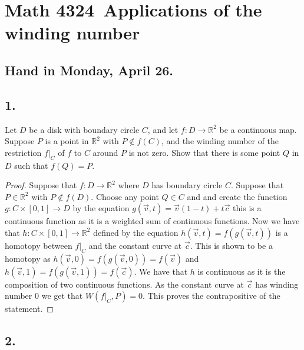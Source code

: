 \documentclass{amsart}
\theoremstyle{plain}
\theoremstyle{definition}
\theoremstyle{remark}
\begin{document}
\section*{Math 4324\  Applications of the winding number} 

\subsection*{Hand in Monday, April 26.} 

\vspace{.25in}

\vspace{.25in}
\noindent
\subsection*{1.} Let $D$ be  a disk with boundary circle $C$, and let $f: D\to \mathbb{R}^2$ be a continuous map. Suppose $P$ is a point in $\mathbb{R}^2$ with $P\not \in f(C)$, and the winding number of the restriction $f|_C$ of $f$ to $C$ around $P$ is not zero. Show that there is some point $Q$ in $D$ such that $f(Q) = P$.

\begin{proof}

    Suppose that $f:D\to \mathbb{R}^2$ where $D$ has boundary circle $C$. Suppose that $P\in \mathbb{R}^2$ with $P\not \in f(D)$. Choose any point $Q\in C$ and and create the function $g:C\times [0,1]\to D$ by the equation $g(\vec v, t)=\vec v(1-t)+t \vec c$ this is a continuous function as it is a weighted sum of continuous functions. Now we have that $h:C\times [0,1]\to \mathbb{R}^2$ defined by the equation $h(\vec v,t)=f(g(\vec v,t))$ is a homotopy between $f|_C$ and the constant curve at $\vec c$. This is shown to be a homotopy as $h(\vec v,0)=f(g(\vec v,0))= f(\vec v)$ and $h(\vec v,1)=f(g(\vec v,1))=f(\vec c)$. We have that $h$ is continuous as it is the composition of two continuous functions. As the constant curve at $\vec c$ has winding number $0$ we get that $W(f|_C,P)=0$. This proves the contrapositive of the statement.
    
\end{proof}

\vspace{.15in}
\noindent
\subsection*{2.}
\end{document}
